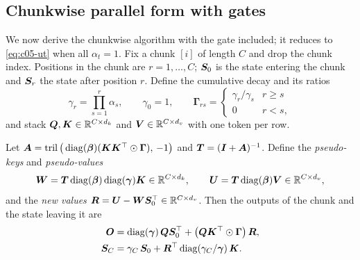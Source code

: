 \subsection{Chunkwise parallel form with gates}\label{sec:c05-gdn-chunk}

We now derive the chunkwise algorithm with the gate included; it reduces to \cref{eq:c05-ut} when
all $\alpha_t = 1$. Fix a chunk $[i]$ of length $C$ and drop the chunk index. Positions in the
chunk are $r = 1,\dots,C$; $\bm{S}_0$ is the state entering the chunk and $\bm{S}_r$ the state after
position $r$. Define the cumulative decay and its ratios
\begin{equation}\label{eq:c05-gamma}
  \gamma_r = \prod_{s=1}^{r}\alpha_s,\qquad \gamma_0 = 1,\qquad
  \bm{\Gamma}_{rs} = \begin{cases}\gamma_r/\gamma_s & r \ge s\\ 0 & r < s,\end{cases}
\end{equation}
and stack $\bm{Q}, \bm{K} \in \mathbb{R}^{C\times d_k}$ and $\bm{V} \in \mathbb{R}^{C\times d_v}$ with one token per row.

\begin{proposition}\label{prop:c05-gdn-chunk}
Let $\bm{A} = \operatorname{tril}\big(\operatorname{diag}(\bm{\beta})(\bm{K}\bm{K}^{\top}\odot\bm{\Gamma}),\,-1\big)$ and
$\bm{T} = (\bm{I} + \bm{A})^{-1}$. Define the \emph{pseudo-keys} and \emph{pseudo-values}
\begin{equation}\label{eq:c05-gdn-wu}
  \bm{W} = \bm{T}\operatorname{diag}(\bm{\beta})\operatorname{diag}(\bm\gamma)\bm{K} \in \mathbb{R}^{C\times d_k},\qquad
  \bm{U} = \bm{T}\operatorname{diag}(\bm{\beta})\bm{V} \in \mathbb{R}^{C\times d_v},
\end{equation}
and the \emph{new values} $\bm{R} = \bm{U} - \bm{W}\bm{S}_0^{\top} \in \mathbb{R}^{C\times d_v}$. Then the outputs of
the chunk and the state leaving it are
\begin{align}
  \bm{O} &= \operatorname{diag}(\bm\gamma)\,\bm{Q}\bm{S}_0^{\top} + \big(\bm{Q}\bm{K}^{\top}\odot\bm\Gamma\big)\,\bm{R},
  \label{eq:c05-gdn-out}\\
  \bm{S}_C &= \gamma_C\,\bm{S}_0 + \bm{R}^{\top}\operatorname{diag}(\gamma_C/\bm\gamma)\,\bm{K} .
  \label{eq:c05-gdn-state}
\end{align}
\end{proposition}

